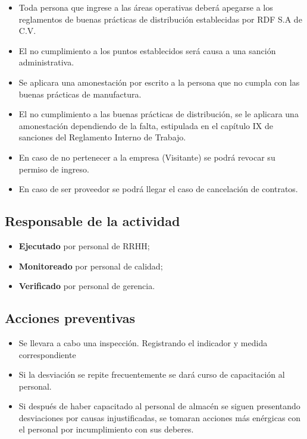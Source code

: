 \begin{itemize}
	\item Toda persona que ingrese a las áreas operativas deberá apegarse a los reglamentos de buenas prácticas de distribución establecidas por \gls{RDF} S.A de C.V.
	\item El no cumplimiento a los puntos establecidos será causa a una sanción administrativa.
	\item Se aplicara una amonestación por escrito a la persona que no cumpla con las buenas prácticas de manufactura.
	\item El no cumplimiento a las buenas prácticas de distribución, se le aplicara una amonestación dependiendo de la falta, estipulada en el capítulo IX de sanciones del Reglamento Interno de Trabajo.
	\item En caso de no pertenecer a la empresa (Visitante) se podrá revocar su permiso de ingreso.
	\item En caso de ser proveedor se podrá llegar el caso de cancelación de contratos.
\end{itemize}

\subsection{Responsable de la actividad}

\begin{itemize}
	\item \textbf{Ejecutado} por personal de RRHH;
	\item \textbf{Monitoreado} por personal de calidad;
	\item \textbf{Verificado} por personal de gerencia.
\end{itemize}

\subsection{Acciones preventivas}

\begin{itemize}
	\item Se llevara a cabo una inspección. Registrando el indicador y medida correspondiente
	\item Si la desviación se repite frecuentemente se dará curso de capacitación al personal.
	\item Si después de haber capacitado al personal de almacén se siguen presentando desviaciones por causas injustificadas, se tomaran acciones más enérgicas con el personal por incumplimiento con sus deberes.
\end{itemize}

